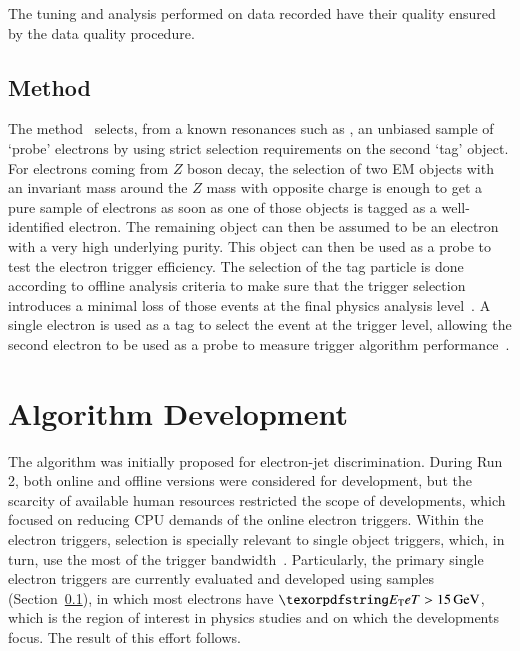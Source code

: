 The tuning and analysis performed on data recorded have their quality ensured by the data quality procedure. 

%


\subsection{\TnP Method}\label{ssec:tnp}

The \tnp{} method~\cite{PERF-2016-01} selects, from a known resonances such as \Zee{}, an unbiased sample of `probe' electrons by using strict selection requirements on the second `tag' object. For electrons coming from $Z$ boson decay, the selection of two EM objects with an invariant mass around the $Z$ mass with opposite charge is enough to get a pure sample of electrons as soon as one of those objects is tagged as a well-identified electron. The remaining object can then be assumed to be an electron with a very high underlying purity. This object can then be used as a probe to test the electron trigger efficiency. The selection of the tag particle is done according to offline analysis criteria to make sure that the trigger selection introduces a minimal loss of those events at the final physics analysis level~\cite{aaboud2019electron}. A single electron is used as a tag to select the event at the trigger level, allowing the second electron to be used as a probe to measure trigger algorithm performance~\cite{aad2020performance}.


\section{Algorithm Development}\label{ssec:rnn_for_online_and_eletrons}

The \rnn{} algorithm was initially proposed for electron-jet discrimination. 
During Run 2, both online and offline versions
were considered for  development, but the scarcity of available human resources restricted the scope of developments, which focused on reducing CPU demands of the online electron triggers. Within the electron triggers, \hlt{} selection is
specially relevant to single object triggers, which, in turn, use the most of the trigger bandwidth~\cite{aad2020performance}. Particularly, the primary single electron triggers
are currently evaluated and developed using \Zee{} \tnp{} samples 
(Section~\ref{ssec:tnp}), in which most electrons have $\et>\SI{15}{\GeV}$, which is the region of interest in physics studies and on which the \rnn{} developments focus. The result of this effort
follows.



